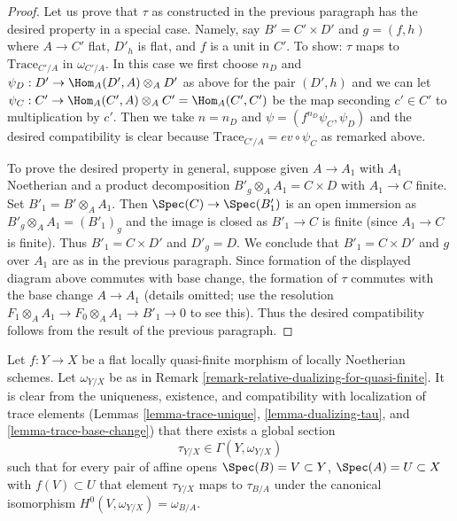 \begin{proof}
\medskip\noindent
Let us prove that $\tau$ as constructed in the previous paragraph
has the desired property in a special case. Namely, say
$B' = C' \times D'$ and $g = (f, h)$ where $A \to C'$ flat, $D'_h$ is flat, and
$f$ is a unit in $C'$.
To show: $\tau$ maps to $\text{Trace}_{C'/A}$ in $\omega_{C'/A}$.
In this case we first choose $n_D$ and
$\psi_D : D' \to \Hom_A(D', A) \otimes_A D'$ as above for the pair
$(D', h)$ and we can let
$\psi_C : C' \to \Hom_A(C', A) \otimes_A C' = \Hom_A(C', C')$
be the map seconding $c' \in C'$ to multiplication by $c'$.
Then we take $n = n_D$ and $\psi = (f^{n_D} \psi_C, \psi_D)$
and the desired compatibility is clear because
$\text{Trace}_{C'/A} = ev \circ \psi_C$ as remarked above.

\medskip\noindent
To prove the desired property in general, suppose given
$A \to A_1$ with $A_1$ Noetherian and a product decomposition
$B'_g \otimes_A A_1 = C \times D$ with $A_1 \to C$ finite.
Set $B'_1 = B' \otimes_A A_1$. Then $\Spec(C) \to \Spec(B'_1)$
is an open immersion as $B'_g \otimes_A A_1 = (B'_1)_g$ and
the image is closed as $B'_1 \to C$ is finite (since $A_1 \to C$
is finite). Thus $B'_1 = C \times D'$ and $D'_g = D$.
We conclude that $B'_1 = C \times D'$ and $g$ over $A_1$
are as in the previous paragraph.
Since formation of the displayed diagram above
commutes with base change, the formation of $\tau$ commutes
with the base change $A \to A_1$ (details omitted; use the
resolution $F_1 \otimes_A A_1 \to F_0 \otimes_A A_1 \to B'_1 \to 0$
to see this). Thus the desired compatibility follows from the result
of the previous paragraph.
\end{proof}

\begin{remark}
\label{remark-relative-dualizing-for-flat-quasi-finite}
Let $f : Y \to X$ be a flat locally quasi-finite morphism of locally
Noetherian schemes. Let $\omega_{Y/X}$ be as in
Remark \ref{remark-relative-dualizing-for-quasi-finite}.
It is clear from the uniqueness, existence, and compatibility with
localization of trace elements
(Lemmas \ref{lemma-trace-unique}, \ref{lemma-dualizing-tau}, and
\ref{lemma-trace-base-change})
that there exists a global section
$$
\tau_{Y/X} \in \Gamma(Y, \omega_{Y/X})
$$
such that for every pair of affine opens
$\Spec(B) = V \subset Y$, $\Spec(A) = U \subset X$ with $f(V) \subset U$
that element $\tau_{Y/X}$ maps to $\tau_{B/A}$ under the
canonical isomorphism
$H^0(V, \omega_{Y/X}) = \omega_{B/A}$.
\end{remark}

